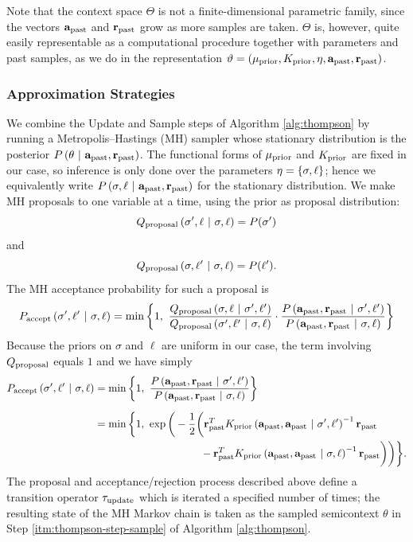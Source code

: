 Note that the context space $\Theta$ is not a finite-dimensional parametric
family, since the vectors $\mathbf{a}_{\textrm{past}}$ and $\mathbf{r}_{\textrm{past}}$ grow as more samples are
taken.  $\Theta$ is, however, quite easily representable as a computational
procedure together with parameters and past samples, as we do in the
representation $\vartheta = (\mu_{\textrm{prior}}, K_{\textrm{prior}}, \eta, \mathbf{a}_{\textrm{past}}, \mathbf{r}_{\textrm{past}})$.

\subsubsection{Approximation Strategies}
We combine the Update and Sample steps of Algorithm \ref{alg:thompson} by
running a Metropolis--Hastings (MH) sampler whose stationary distribution is the
posterior $P\left( \theta \ \middle\vert\  \mathbf{a}_{\textrm{past}}, \mathbf{r}_{\textrm{past}} \right)$.  The functional forms of
$\mu_{\textrm{prior}}$ and $K_{\textrm{prior}}$ are fixed in our case, so inference is only done
over the parameters $\eta = \left\{ \sigma,\ell \right\}$; hence we equivalently write
$P\left( \sigma,\ell \ \middle\vert\  \mathbf{a}_{\textrm{past}}, \mathbf{r}_{\textrm{past}} \right)$ for the stationary
distribution.  We make MH proposals to one variable at a time, using the prior
as proposal distribution:
\[
  Q_{\textrm{proposal}}\left( \sigma',\ell \ \middle\vert\  \sigma,\ell \right) = P(\sigma')
\]
and
\[
  Q_{\textrm{proposal}}\left( \sigma,\ell' \ \middle\vert\  \sigma,\ell \right) = P(\ell').
\]
The MH acceptance probability for such a proposal is
\[
  P_{\textrm{accept}}\left( \sigma',\ell' \ \middle\vert\  \sigma,\ell \right)
  =
  \min\left\{ 1,\ \frac{
    Q_{\textrm{proposal}}\left( \sigma,\ell \ \middle\vert\  \sigma',\ell' \right)
    }{
    Q_{\textrm{proposal}}\left( \sigma',\ell' \ \middle\vert\  \sigma,\ell \right)
    }
  \cdot
  \frac{
    P\left( \mathbf{a}_{\textrm{past}},\mathbf{r}_{\textrm{past}} \ \middle\vert\  \sigma',\ell' \right)
    }{
    P\left( \mathbf{a}_{\textrm{past}},\mathbf{r}_{\textrm{past}} \ \middle\vert\  \sigma,\ell \right)
    } \right\}
\]
Because the priors on $\sigma$ and $\ell$ are uniform in our case, the term
involving $Q_{\textrm{proposal}}$ equals $1$ and we have simply
\begin{align*}
  P_{\textrm{accept}}\left( \sigma',\ell' \ \middle\vert\  \sigma,\ell \right)
  &=
  \min\left\{ 1,\ \frac{
    P\left( \mathbf{a}_{\textrm{past}},\mathbf{r}_{\textrm{past}} \ \middle\vert\  \sigma',\ell' \right)
    }{
    P\left( \mathbf{a}_{\textrm{past}},\mathbf{r}_{\textrm{past}} \ \middle\vert\  \sigma,\ell \right)
    } \right\} \\[2mm]
  &=
  \min\bigg\{1,\ \exp\bigg( -\frac12\bigg(
    \mathbf{r}_{\textrm{past}}^T K_{\textrm{prior}}\left( \mathbf{a}_{\textrm{past}}, \mathbf{a}_{\textrm{past}} \ \middle\vert\  \sigma', \ell' \right)^{-1} \mathbf{r}_{\textrm{past}} \\
  & \qquad\qquad\qquad\qquad\qquad -
    \mathbf{r}_{\textrm{past}}^T K_{\textrm{prior}}\left( \mathbf{a}_{\textrm{past}}, \mathbf{a}_{\textrm{past}} \ \middle\vert\  \sigma, \ell \right)^{-1} \mathbf{r}_{\textrm{past}}
  \bigg)\bigg)\bigg\}.
\end{align*}
The proposal and acceptance/rejection process described above define a
transition operator $\tau_{\textrm{update}}$ which is iterated a specified number of
times; the resulting state of the MH Markov chain is taken as the sampled
semicontext $\theta$ in Step \ref{itm:thompson-step-sample} of Algorithm
\ref{alg:thompson}.

